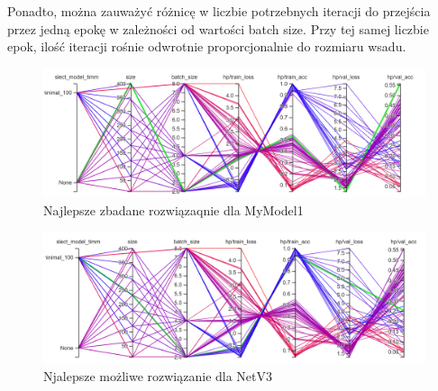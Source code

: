 \documentclass[12pt,twoside]{article}
\begin{document}
Ponadto, można zauważyć różnicę w liczbie potrzebnych iteracji do przejścia przez jedną epokę w zależności od wartości batch size. Przy tej samej liczbie epok, ilość iteracji rośnie odwrotnie proporcjonalnie do rozmiaru wsadu.
\begin{figure}[h]
	\centering
	\includegraphics[width=1\textwidth]{figures/myModelbest.png}
	\caption{Najlepsze zbadane rozwiązaqnie dla MyModel1}
	\label{fig:123432}
\end{figure}
\begin{figure}[h]
	\centering
	\includegraphics[width=1\textwidth]{figures/netv3best.png}
	\caption{Njalepsze możliwe rozwiązanie dla NetV3}
	\label{fig:da2352ne}
\end{figure}
\end{document}
